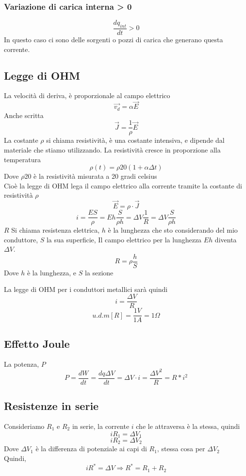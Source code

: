 \documentclass[a4paper]{report}
\begin{document}
  \subsubsection{Variazione di carica interna > 0}
  $$\frac{dq_{int}}{dt} > 0$$
  In questo caso ci sono delle sorgenti o pozzi di carica che generano questa corrente.

  \subsection{Legge di OHM}
  La velocità di deriva, è proporzionale al campo elettrico
  $$ \vec{v_d} = \alpha \vec{E} $$
  Anche scritta
  $$ \vec{J} = \frac{1}{\rho} \vec{E} $$
  La costante $\rho$ si chiama resistività, è una costante intensiva, e dipende dal materiale che stiamo utilizzando.
  La resistività cresce in proporzione alla temperatura
  $$ \rho(t) = \rho{20}(1 + \alpha \Delta t) $$
  Dove $\rho{20}$ è la resistività misurata a 20 gradi celsius\\
  Cioè la legge di OHM lega il campo elettrico alla corrente tramite la costante di resistività $\rho$
  $$ \vec{E} = \rho \cdot \vec{J} $$
  $$ i = \frac{ES}{\rho} = Eh \frac{S}{\rho h} = \Delta V \frac{1}{R} = \Delta V \frac{S}{\rho h} $$
  $R$ Si chiama resistenza elettrica, $h$ è la lunghezza che sto considerando del mio conduttore, $S$ la sua superficie, Il campo elettrico per la lunghezza $Eh$ diventa $\Delta V$.
  $$ R = \rho \frac{h}{S} $$
  Dove $h$ è la lunghezza, e $S$ la sezione

  La legge di OHM per i conduttori metallici sarà quindi
  $$ i = \frac{\Delta V}{R} $$
  $$ u.d.m[R] = \frac{1V}{1A} = 1 \Omega $$

  \subsection{Effetto Joule}
  La potenza, $P$
  $$ P=\frac{dW}{dt} = \frac{dq\Delta V}{dt} = \Delta V \cdot i = \frac{\Delta V^2}{R} = R*i^2$$

  \subsection{Resistenze in serie}
  Consideriamo $R_1$ e $R_2$ in serie, la corrente $i$ che le attraversa è la stessa, quindi
  $$ i R_1 = \Delta V_1 $$
  $$ i R_2 = \Delta V_2 $$
  Dove $\Delta V_1$ è la differenza di potenziale ai capi di $R_1$, stessa cosa per $\Delta V_2$\\
  Quindi,
  $$ i R^* = \Delta V \Rightarrow R^* = R_1 +R_2 $$
\end{document}
